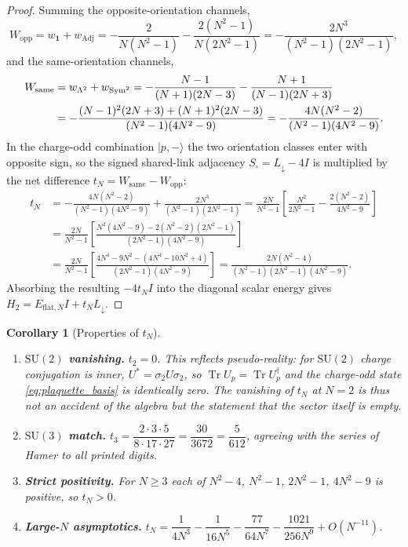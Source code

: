 \documentclass[11pt,a4paper]{article}
\newtheorem{corollary}[theorem]{Corollary}
\theoremstyle{definition}
\DeclareMathOperator{\Tr}{Tr}
\DeclareMathOperator{\Adj}{Adj}
\DeclareMathOperator{\Sym}{Sym}
\newcommand{\Ldn}{L_{\downarrow}}
\newcommand{\Ssq}{S_{\square}}
\newcommand{\dg}{^{\dagger}}
\newcommand{\SU}{\mathrm{SU}}
\newcommand{\Wopp}{W_{\mathrm{opp}}}
\newcommand{\Wsame}{W_{\mathrm{same}}}
\begin{document}
\begin{proof}
Summing the opposite-orientation channels,
\begin{equation}\label{eq:Wopp_sum}
  \Wopp = w_{\mathbf{1}} + w_{\Adj} = -\frac{2}{N(N^2-1)} - \frac{2(N^2-1)}{N(2N^2-1)} = -\frac{2N^3}{(N^2-1)(2N^2-1)},
\end{equation}
and the same-orientation channels,
\begin{align}\label{eq:Wsame_sum}
  \Wsame &= w_{\Lambda^2} + w_{\Sym^2} = -\frac{N-1}{(N+1)(2N-3)} - \frac{N+1}{(N-1)(2N+3)} \notag \\
    &= -\frac{(N-1)^2(2N+3) + (N+1)^2(2N-3)}{(N^2-1)(4N^2-9)} = -\frac{4N(N^2-2)}{(N^2-1)(4N^2-9)} .
\end{align}
In the charge-odd combination $|p,-\rangle$ the two orientation classes enter with opposite sign, so the signed shared-link adjacency $\Ssq = \Ldn - 4I$ is multiplied by the net difference $t_N = \Wsame - \Wopp$:
\begin{align*}
  t_N &= -\frac{4N(N^2-2)}{(N^2-1)(4N^2-9)} + \frac{2N^3}{(N^2-1)(2N^2-1)}
      = \frac{2N}{N^2-1}\left[\frac{N^2}{2N^2-1} - \frac{2(N^2-2)}{4N^2-9}\right] \\
      &= \frac{2N}{N^2-1}\left[\frac{N^2(4N^2-9) - 2(N^2-2)(2N^2-1)}{(2N^2-1)(4N^2-9)}\right] \\
      &= \frac{2N}{N^2-1}\left[\frac{4N^4-9N^2 - (4N^4-10N^2+4)}{(2N^2-1)(4N^2-9)}\right]
      = \frac{2N(N^2-4)}{(N^2-1)(2N^2-1)(4N^2-9)} .
\end{align*}
Absorbing the resulting $-4t_N I$ into the diagonal scalar energy gives $H_2 = E_{\mathrm{flat},N}I + t_N\Ldn$.
\end{proof}

\begin{corollary}[Properties of $t_N$]\label{cor:tN_properties}
\begin{enumerate}\itemsep1pt
  \item \textbf{$\SU(2)$ vanishing.} $t_2 = 0$. This reflects pseudo-reality: for $\SU(2)$ charge conjugation is inner, $U^* = \sigma_2 U\sigma_2$, so $\Tr U_p = \Tr U_p\dg$ and the charge-odd state \eqref{eq:plaquette_basis} is identically zero. The vanishing of $t_N$ at $N=2$ is thus not an accident of the algebra but the statement that the sector itself is empty.
  \item \textbf{$\SU(3)$ match.} $t_3 = \dfrac{2\cdot3\cdot5}{8\cdot17\cdot27} = \dfrac{30}{3672} = \dfrac{5}{612}$, agreeing with the series of Hamer \cite{Hamer1989} to all printed digits.
  \item \textbf{Strict positivity.} For $N\ge3$ each of $N^2-4$, $N^2-1$, $2N^2-1$, $4N^2-9$ is positive, so $t_N>0$.
  \item \textbf{Large-$N$ asymptotics.}
  $t_N = \dfrac{1}{4N^3} - \dfrac{1}{16N^5} - \dfrac{77}{64N^7} - \dfrac{1021}{256N^9} + O(N^{-11})$.
\end{enumerate}
\end{corollary}
\end{document}
